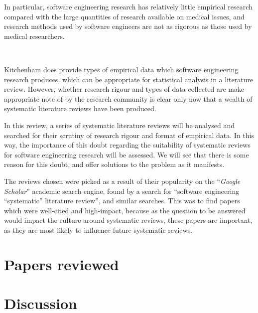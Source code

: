 \begin{displayquote}
    In particular, software engineering research has relatively little empirical research compared with the large quantities of research available on medical issues, and research methods used by software engineers are not as rigorous as those used by medical researchers.
\end{displayquote}~\cite{Kitchenham2004}

Kitchenham does provide types of empirical data which software engineering research produces, which can be appropriate for statistical analysis in a literature review. However, whether research rigour and types of data collected are make appropriate note of by the research community is clear only now that a wealth of systematic literature reviews have been produced.\par

In this review, a series of systematic literature reviews will be analysed and searched for their scrutiny of research rigour and format of empirical data. In this way, the importance of this doubt regarding the suitability of systematic reviews for software engineering research will be assessed. We will see that there is some reason for this doubt, and offer solutions to the problem as it manifests.\par

The reviews chosen were picked as a result of their popularity on the ``\emph{Google Scholar}'' academic search engine, found by a search for ``software engineering ``systematic'' literature review'', and similar searches. This was to find papers which were well-cited and high-impact, because as the question to be answered would impact the culture around systematic reviews, these papers are important, as they are most likely to influence future systematic reviews.\par


\section{Papers reviewed}








\section{Discussion}\label{sec:discussion}

